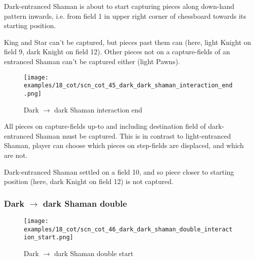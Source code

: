 \vspace*{-0.5\baselineskip}
Dark-entranced Shaman is about to start capturing pieces along down-hand pattern
inwards, i.e. from field 1 in upper right corner of chessboard towards its starting
position.

King and Star can't be captured, but pieces past them can (here, light Knight on
field 9, dark Knight on field 12). Other pieces not on a capture-fields of an
entranced Shaman can't be captured either (light Pawns).

\clearpage %

\noindent
\begin{figure}[!h]
\texttt{[image: examples/18\_cot/scn\_cot\_45\_dark\_dark\_shaman\_interaction\_end.png]}
\caption{Dark $\rightarrow$ dark Shaman interaction end}
\label{fig:scn_cot_45_dark_dark_shaman_interaction_end}
\end{figure}

All pieces on capture-fields up-to and including destination field of dark-entranced
Shaman must be captured. This is in contrast to light-entranced Shaman, player can
choose which pieces on step-fields are displaced, and which are not.

Dark-entranced Shaman settled on a field 10, and so piece closer to starting position
(here, dark Knight on field 12) is not captured.

\clearpage %

\subsubsection*{Dark $\rightarrow$ dark Shaman double}
\label{sec:Conquest of Tlalocan/Trance-journey/Interactions/Dark --> dark Shaman double}

\vspace*{-1.4\baselineskip}
\noindent
\begin{figure}[!h]
\texttt{[image: examples/18\_cot/scn\_cot\_46\_dark\_dark\_shaman\_double\_interaction\_start.png]}
\caption{Dark $\rightarrow$ dark Shaman double start}
\label{fig:scn_cot_46_dark_dark_shaman_double_interaction_start}
\end{figure}

